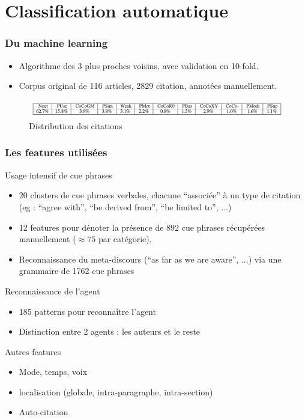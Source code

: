 \documentclass[10pt]{beamer}
\begin{document}
\section{Classification automatique}
\label{sec:machinelearning}

\begin{frame}
\frametitle{Du machine learning}
  \begin{itemize} 
  \item Algorithme des 3 plus proches voisins, avec validation en 10-fold.
  \item Corpus original de 116 articles, 2829 citation, annotées manuellement.
  \end{itemize}
  \begin{figure}[h]
    \centering
    \includegraphics[width=\textwidth]{distrib}
    \caption{Distribution des citations}
  \end{figure}
\end{frame}

\begin{frame}
  \frametitle{Les features utilisées}
  Usage intensif de cue phrases
  \begin{itemize}
  \item 20 clusters de cue phrases verbales, chacune ``associée'' à un
    type de citation (eg : ``agree with'', ``be derived from'', ``be
    limited to'', ...)
  \item 12 features pour dénoter la présence de 892 cue phrases
    récupérées manuellement ($\approx 75$ par catégorie).
  \item Reconnaissance du meta-discours (``as far as we are aware'',
    ...) via une grammaire de 1762 cue phrases
  \end{itemize}
  Reconnaissance de l'agent
    \begin{itemize}
    \item 185 patterns pour reconnaître l'agent
    \item Distinction entre 2 agents : les auteurs et le reste
    \end{itemize}
  Autres features
  \begin{itemize}
  \item Mode, temps, voix
  \item localisation (globale, intra-paragraphe,
    intra-section)
  \item Auto-citation
  \end{itemize}

\end{frame}
\end{document}
